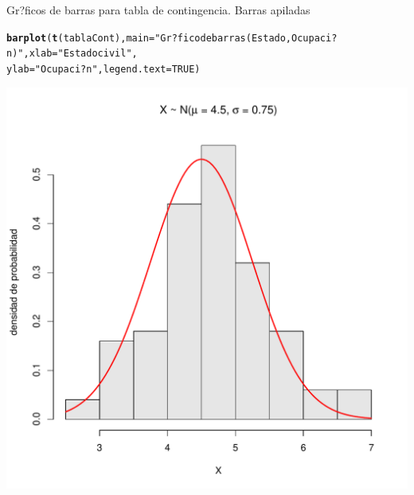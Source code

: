 \documentclass[10pt,a4paper]{article}\usepackage[]{graphicx}\usepackage[]{color}
\makeatletter
\def\maxwidth{ %
  \ifdim\Gin@nat@width>\linewidth
    \linewidth
  \else
    \Gin@nat@width
  \fi
}
\newcommand{\hlnum}[1]{\textcolor[rgb]{0.686,0.059,0.569}{#1}}%
\newcommand{\hlstr}[1]{\textcolor[rgb]{0.192,0.494,0.8}{#1}}%
\newcommand{\hlstd}[1]{\textcolor[rgb]{0.345,0.345,0.345}{#1}}%
\newcommand{\hlkwc}[1]{\textcolor[rgb]{0.333,0.667,0.333}{#1}}%
\newcommand{\hlkwd}[1]{\textcolor[rgb]{0.737,0.353,0.396}{\textbf{#1}}}%
\newenvironment{kframe}{%
 \def\at@end@of@kframe{}%
 \ifinner\ifhmode%
  \def\at@end@of@kframe{\end{minipage}}%
  \begin{minipage}{\columnwidth}%
 \fi\fi%
 \def\FrameCommand##1{\hskip\@totalleftmargin \hskip-\fboxsep
 \colorbox{shadecolor}{##1}\hskip-\fboxsep
     \hskip-\linewidth \hskip-\@totalleftmargin \hskip\columnwidth}%
 \MakeFramed {\advance\hsize-\width
   \@totalleftmargin\z@ \linewidth\hsize
   \@setminipage}}%
 {\par\unskip\endMakeFramed%
 \at@end@of@kframe}
\newenvironment{knitrout}{}{} %
\makeatother
\begin{document}
 Gr?ficos de barras para tabla de contingencia. 
 Barras apiladas 
\begin{knitrout}
\color{fgcolor}\begin{kframe}
\begin{alltt}
\hlkwd{barplot}\hlstd{(}\hlkwd{t}\hlstd{(tablaCont),} \hlkwc{main}\hlstd{=}\hlstr{"Gr?fico de barras (Estado, Ocupaci?n)"}\hlstd{,} \hlkwc{xlab}\hlstd{=}\hlstr{"Estado civil"}\hlstd{,}
\hlkwc{ylab}\hlstd{=}\hlstr{"Ocupaci?n"}\hlstd{,} \hlkwc{legend.text}\hlstd{=}\hlnum{TRUE}\hlstd{)}
\end{alltt}
\end{kframe}
\includegraphics[width=\maxwidth]{figure/unnamed-chunk-6-1} 

\end{knitrout}
\end{document}
